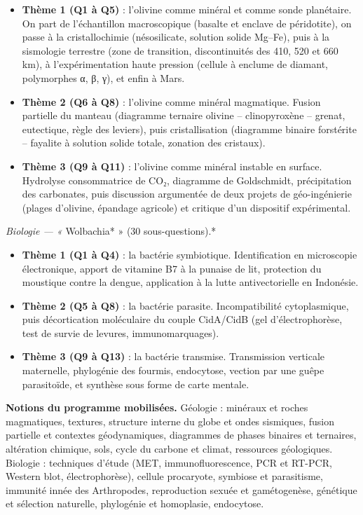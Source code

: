 \documentclass[11pt,a4paper]{article}
\providecommand{\tightlist}{\setlength{\itemsep}{0pt}\setlength{\parskip}{0pt}}
\begin{document}
\begin{itemize}
\tightlist
\item
  \textbf{Thème 1 (Q1 à Q5)} : l'olivine comme minéral et comme sonde planétaire. On part de l'échantillon macroscopique (basalte et enclave de péridotite), on passe à la cristallochimie (nésosilicate, solution solide Mg--Fe), puis à la sismologie terrestre (zone de transition, discontinuités des 410, 520 et 660 km), à l'expérimentation haute pression (cellule à enclume de diamant, polymorphes α, β, γ), et enfin à Mars.
\item
  \textbf{Thème 2 (Q6 à Q8)} : l'olivine comme minéral magmatique. Fusion partielle du manteau (diagramme ternaire olivine -- clinopyroxène -- grenat, eutectique, règle des leviers), puis cristallisation (diagramme binaire forstérite -- fayalite à solution solide totale, zonation des cristaux).
\item
  \textbf{Thème 3 (Q9 à Q11)} : l'olivine comme minéral instable en surface. Hydrolyse consommatrice de CO₂, diagramme de Goldschmidt, précipitation des carbonates, puis discussion argumentée de deux projets de géo-ingénierie (plages d'olivine, épandage agricole) et critique d'un dispositif expérimental.
\end{itemize}

\emph{Biologie --- « }Wolbachia* » (30 sous-questions).*

\begin{itemize}
\tightlist
\item
  \textbf{Thème 1 (Q1 à Q4)} : la bactérie symbiotique. Identification en microscopie électronique, apport de vitamine B7 à la punaise de lit, protection du moustique contre la dengue, application à la lutte antivectorielle en Indonésie.
\item
  \textbf{Thème 2 (Q5 à Q8)} : la bactérie parasite. Incompatibilité cytoplasmique, puis décortication moléculaire du couple CidA/CidB (gel d'électrophorèse, test de survie de levures, immunomarquages).
\item
  \textbf{Thème 3 (Q9 à Q13)} : la bactérie transmise. Transmission verticale maternelle, phylogénie des fourmis, endocytose, vection par une guêpe parasitoïde, et synthèse sous forme de carte mentale.
\end{itemize}

\textbf{Notions du programme mobilisées.} Géologie : minéraux et roches magmatiques, textures, structure interne du globe et ondes sismiques, fusion partielle et contextes géodynamiques, diagrammes de phases binaires et ternaires, altération chimique, sols, cycle du carbone et climat, ressources géologiques. Biologie : techniques d'étude (MET, immunofluorescence, PCR et RT-PCR, Western blot, électrophorèse), cellule procaryote, symbiose et parasitisme, immunité innée des Arthropodes, reproduction sexuée et gamétogenèse, génétique et sélection naturelle, phylogénie et homoplasie, endocytose.
\end{document}

